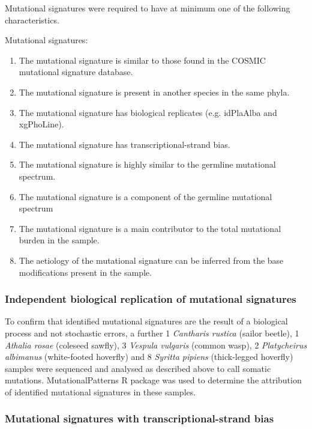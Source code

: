 Mutational signatures were required to have at minimum one of the following characteristics. 

\begin{description}
    \item[Mutational signatures:]
\end{description}
\begin{enumerate}
\item The mutational signature is similar to those found in the COSMIC mutational signature database.
\item The mutational signature is present in another species in the same phyla. 
\item The mutational signature has biological replicates (e.g. idPlaAlba and xgPhoLine).
\item The mutational signature has transcriptional-strand bias.
\item The mutational signature is highly similar to the germline mutational spectrum.
\item The mutational signature is a component of the germline mutational spectrum
\item The mutational signature is a main contributor to the total mutational burden in the sample. 
\item The aetiology of the mutational signature can be inferred from the base modifications present in the sample. 
\end{enumerate}

\subsubsection{Independent biological replication of mutational signatures}

To confirm that identified mutational signatures are the result of a biological process and not stochastic errors, a further 1 \textit{Cantharis rustica} (sailor beetle), 1 \textit{Athalia rosae} (coleseed sawfly), 3 \textit{Vespula vulgaris} (common wasp), 2 \textit{Platycheirus albimanus} (white-footed hoverfly) and 8 \textit{Syritta pipiens}  (thick-legged hoverfly) samples were sequenced and analysed as described above to call somatic mutations. MutationalPatterns R package \cite{} was used to determine the attribution of identified mutational signatures in these samples. 

\subsubsection{Mutational signatures with transcriptional-strand bias}


